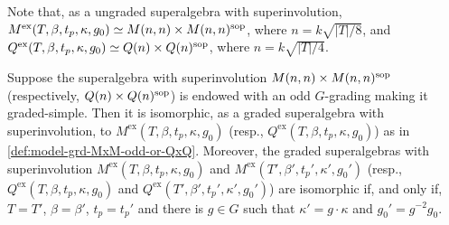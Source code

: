 Note that, as a ungraded superalgebra with superinvolution, $M^{\mathrm{ex}}(T, \beta, t_p, \kappa, g_0) \simeq M(n,n)\times M(n,n)^{\mathrm{sop}}$, where $n = k \sqrt{|T|/8}$, and $Q^{\mathrm{ex}}(T, \beta, t_p, \kappa, g_0) \simeq Q(n)\times Q(n)^{\mathrm{sop}}$, where $n = k \sqrt{|T|/4}$.

\begin{thm}\label{thm:MxM-odd}
    Suppose the superalgebra with superinvolution $M(n,n) \times M(n,n)^{\mathrm{sop}}$ (respectively, $Q(n) \times Q(n)^{\mathrm{sop}}$) is endowed with an odd $G$-grading making it graded-simple. 
    Then it is isomorphic, as a graded superalgebra with superinvolution, to $M^{\mathrm{ex}}(T,\beta, t_p, \kappa, g_0)$ (resp., $Q^{\mathrm{ex}}(T,\beta, t_p, \kappa, g_0)$) as in \cref{def:model-grd-MxM-odd-or-QxQ}. 
    Moreover, the graded superalgebras with superinvolution $M^{\mathrm{ex}} (T, \beta,  t_p, \kappa, g_0)$  and $M^{\mathrm{ex}} (T', \beta',  t_p', \kappa', g_0')$ (resp., $Q^{\mathrm{ex}} (T, \beta,  t_p, \kappa, g_0)$ and $Q^{\mathrm{ex}} (T', \beta',  t_p', \kappa', g_0')$) are isomorphic if, and only if, $T =T'$, $\beta = \beta'$, $t_p = t_p'$ and there is $g \in G$ such that $\kappa' = g\cdot\kappa$ and $g_0' = g^{-2}g_0$. 
\end{thm}

